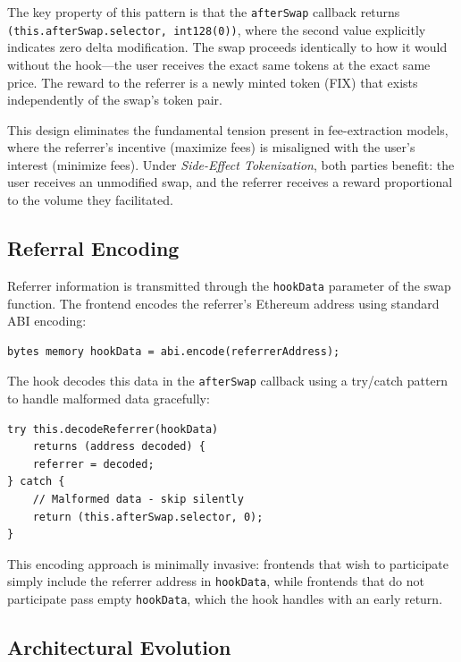\documentclass[conference]{IEEEtran}
\begin{document}
The key property of this pattern is that the \texttt{afterSwap} callback returns \texttt{(this.afterSwap.selector,\allowbreak{} int128(0))}, where the second value explicitly indicates zero delta modification. The swap proceeds identically to how it would without the hook---the user receives the exact same tokens at the exact same price. The reward to the referrer is a newly minted token (FIX) that exists independently of the swap's token pair.

This design eliminates the fundamental tension present in fee-extraction models, where the referrer's incentive (maximize fees) is misaligned with the user's interest (minimize fees). Under \textit{Side-Effect Tokenization}, both parties benefit: the user receives an unmodified swap, and the referrer receives a reward proportional to the volume they facilitated.

\subsection{Referral Encoding}

Referrer information is transmitted through the \texttt{hookData} parameter of the swap function. The frontend encodes the referrer's Ethereum address using standard ABI encoding:

\begin{lstlisting}[language=Solidity]
bytes memory hookData = abi.encode(referrerAddress);
\end{lstlisting}

The hook decodes this data in the \texttt{afterSwap} callback using a try/catch pattern to handle malformed data gracefully:

\begin{lstlisting}[language=Solidity]
try this.decodeReferrer(hookData)
    returns (address decoded) {
    referrer = decoded;
} catch {
    // Malformed data - skip silently
    return (this.afterSwap.selector, 0);
}
\end{lstlisting}

This encoding approach is minimally invasive: frontends that wish to participate simply include the referrer address in \texttt{hookData}, while frontends that do not participate pass empty \texttt{hookData}, which the hook handles with an early return.

\subsection{Architectural Evolution}
\end{document}
